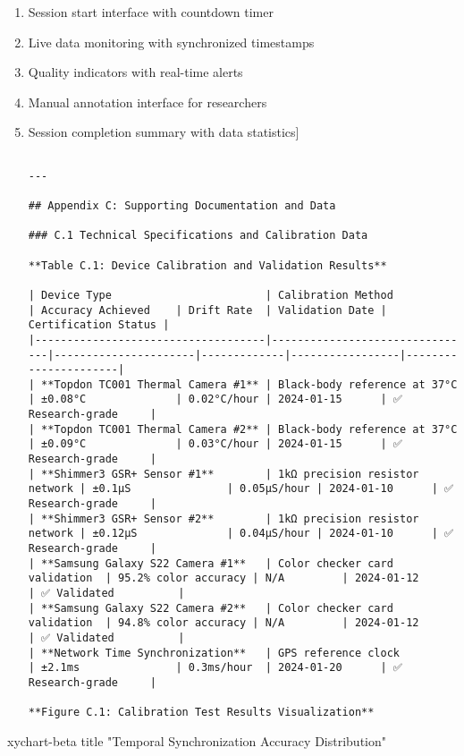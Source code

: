\documentclass[11pt,a4paper]{report}
\begin{document}
\begin{enumerate}
\item Session start interface with countdown timer
\item Live data monitoring with synchronized timestamps
\item Quality indicators with real-time alerts
\item Manual annotation interface for researchers
\item Session completion summary with data statistics]
\begin{verbatim}

---

## Appendix C: Supporting Documentation and Data

### C.1 Technical Specifications and Calibration Data

**Table C.1: Device Calibration and Validation Results**

| Device Type                        | Calibration Method             | Accuracy Achieved    | Drift Rate  | Validation Date | Certification Status |
|------------------------------------|--------------------------------|----------------------|-------------|-----------------|----------------------|
| **Topdon TC001 Thermal Camera #1** | Black-body reference at 37°C   | ±0.08°C              | 0.02°C/hour | 2024-01-15      | ✅ Research-grade     |
| **Topdon TC001 Thermal Camera #2** | Black-body reference at 37°C   | ±0.09°C              | 0.03°C/hour | 2024-01-15      | ✅ Research-grade     |
| **Shimmer3 GSR+ Sensor #1**        | 1kΩ precision resistor network | ±0.1µS               | 0.05µS/hour | 2024-01-10      | ✅ Research-grade     |
| **Shimmer3 GSR+ Sensor #2**        | 1kΩ precision resistor network | ±0.12µS              | 0.04µS/hour | 2024-01-10      | ✅ Research-grade     |
| **Samsung Galaxy S22 Camera #1**   | Color checker card validation  | 95.2% color accuracy | N/A         | 2024-01-12      | ✅ Validated          |
| **Samsung Galaxy S22 Camera #2**   | Color checker card validation  | 94.8% color accuracy | N/A         | 2024-01-12      | ✅ Validated          |
| **Network Time Synchronization**   | GPS reference clock            | ±2.1ms               | 0.3ms/hour  | 2024-01-20      | ✅ Research-grade     |

**Figure C.1: Calibration Test Results Visualization**

\end{verbatim}
\end{enumerate}
xychart-beta
    title "Temporal Synchronization Accuracy Distribution"
\end{document}
